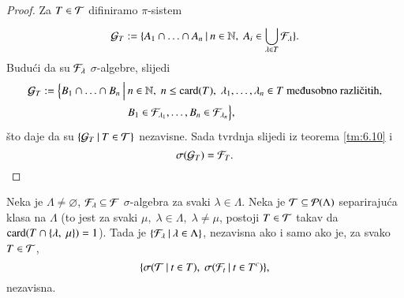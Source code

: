 \begin{proof}
    Za $T \in \mathcal{T}$ difiniramo $\pi$-sistem
    \begin{equation*}
        \mathcal{G}_T := \{{A_1 \cap \ldots \cap A_n} \: | \: {n \in \mathbb{N}, \; A_i \in \bigcup\limits_{\lambda \in T}^{}\mathcal{F}_\lambda}\}.
    \end{equation*}
    Budu\' ci da su $\mathcal{F}_\lambda$ $\sigma$-algebre, slijedi
    \begin{align*}
        \famG_T := \Big\{B_1 \cap \ldots \cap B_n \: \Big| \: &n \in \nat, \; n \leq \card{T}, \; \lambda_1, \ldots, \lambda_n \in T \textnormal{ me\dj usobno razli\v citih},\\ &B_1 \in \famF_{\lambda_1},\ldots, B_n \in \famF_{\lambda_n} \Big\},
    \end{align*}
    \v sto daje da su $\{{\mathcal{G}_T} \: | \: {T \in \mathcal{T}}\}$ nezavisne.
    Sada tvrdnja slijedi iz teorema \ref{tm:6.10} i
    \begin{equation*}
        \sigma({\mathcal{G}_T}) = \mathcal{F}_T.
    \end{equation*}
\end{proof}

\begin{prop}    \label{prop:6.12}
    Neka je $\Lambda \neq \varnothing$, $\mathcal{F}_\lambda \subseteq \mathcal{F}$ $\sigma$-algebra za svaki $\lambda \in \Lambda$.
    Neka je $\mathcal{T} \subseteq \mathcal{P}({\Lambda})$ separiraju\' ca klasa na $\Lambda$ (to jest za svaki $\mu, \; \lambda \in \Lambda, \; \lambda \neq \mu$, postoji $T \in \mathcal{T}$ takav da $\textnormal{card}({T \cap \{\lambda, \; \mu\}}) = 1$).
    Tada je $\{{\mathcal{F}_\lambda} \: | \: {\lambda \in \Lambda}\}$, nezavisna ako i samo ako je, za svako $T \in \mathcal{T}$,
    \begin{equation*}
        \{ \sigma({\mathcal{T}} \: | \: {t \in T}), \; \sigma({\mathcal{F}_t} \: | \: {t \in T^c}) \},
    \end{equation*}
    nezavisna.
\end{prop}

